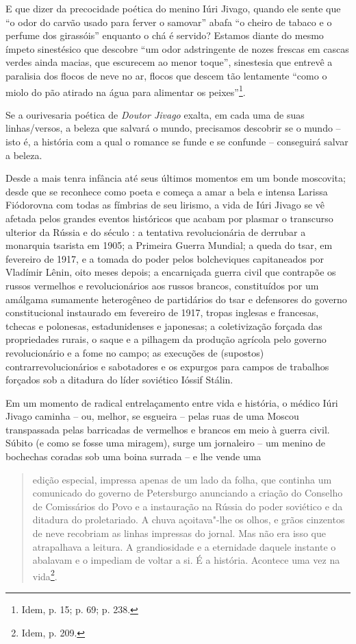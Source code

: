 E que dizer da precocidade poética do menino Iúri Jivago, quando ele
sente que ``o odor do carvão usado para ferver o samovar'' abafa ``o
cheiro de tabaco e o perfume dos girassóis'' enquanto o chá é servido?
Estamos diante do mesmo ímpeto sinestésico que descobre ``um odor
adstringente de nozes frescas em cascas verdes ainda macias, que
escurecem ao menor toque'', sinestesia que entrevê a paralisia dos
flocos de neve no ar, flocos que descem tão lentamente ``como o miolo do
pão atirado na água para alimentar os peixes''\footnote{Idem, p. 15; p.
  69; p. 238.}.

Se a ourivesaria poética de \emph{Doutor Jivago} exalta, em cada uma de
suas linhas/versos, a beleza que salvará o mundo, precisamos descobrir
se o mundo -- isto é, a história com a qual o romance se funde e se
confunde -- conseguirá salvar a beleza.

Desde a mais tenra infância até seus últimos momentos em um bonde
moscovita; desde que se reconhece como poeta e começa a amar a bela e
intensa Larissa Fiódorovna com todas as fímbrias de seu lirismo, a vida
de Iúri Jivago se vê afetada pelos grandes eventos históricos que acabam
por plasmar o transcurso ulterior da Rússia e do século : a tentativa
revolucionária de derrubar a monarquia tsarista em 1905; a Primeira
Guerra Mundial; a queda do tsar, em fevereiro de 1917, e a tomada do
poder pelos bolcheviques capitaneados por Vladímir Lênin, oito meses
depois; a encarniçada guerra civil que contrapõe os russos vermelhos e
revolucionários aos russos brancos, constituídos por um amálgama
sumamente heterogêneo de partidários do tsar e defensores do governo
constitucional instaurado em fevereiro de 1917, tropas inglesas e
francesas, tchecas e polonesas, estadunidenses e japonesas; a
coletivização forçada das propriedades rurais, o saque e a pilhagem da
produção agrícola pelo governo revolucionário e a fome no campo; as
execuções de (supostos) contrarrevolucionários e sabotadores e os
expurgos para campos de trabalhos forçados sob a ditadura do líder
soviético Ióssif Stálin.

Em um momento de radical entrelaçamento entre vida e história, o médico
Iúri Jivago caminha -- ou, melhor, se esgueira -- pelas ruas de uma
Moscou transpassada pelas barricadas de vermelhos e brancos em meio à
guerra civil. Súbito (e como se fosse uma miragem), surge um jornaleiro
-- um menino de bochechas coradas sob uma boina surrada -- e lhe vende
uma

\begin{quote}
edição especial, impressa apenas de um lado da folha, que continha um
comunicado do governo de Petersburgo anunciando a criação do Conselho de
Comissários do Povo e a instauração na Rússia do poder soviético e da
ditadura do proletariado. A chuva açoitava"-lhe os olhos, e grãos
cinzentos de neve recobriam as linhas impressas do jornal. Mas não era
isso que atrapalhava a leitura. A grandiosidade e a eternidade daquele
instante o abalavam e o impediam de voltar a si. É a história. Acontece
uma vez na vida\footnote{Idem, p. 209.}.
\end{quote}

